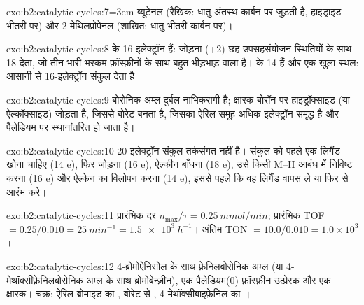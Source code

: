 \begin{solution}{exo:b2:catalytic-cycles:7}\emergencystretch=3em
ब्यूटेनल  (रैखिक: धातु अंतस्थ कार्बन पर जुड़ती है, हाइड्राइड
भीतरी पर) और 2-मेथिलप्रोपेनल  (शाखित: धातु भीतरी
कार्बन पर)।
\end{solution}

\begin{solution}{exo:b2:catalytic-cycles:8}
 के 16 इलेक्ट्रॉन हैं:  जोड़ना (+2) छह
उपसहसंयोजन स्थितियों के साथ 18 देता, जो तीन भारी-भरकम फ़ॉस्फ़ीनों के साथ बहुत भीड़भाड़ वाला है।  के 14
हैं और एक खुला स्थल:  आसानी से 16-इलेक्ट्रॉन संकुल देता है।
\end{solution}

\begin{solution}{exo:b2:catalytic-cycles:9}
बोरोनिक अम्ल दुर्बल नाभिकरागी है; क्षारक बोरॉन पर हाइड्रॉक्साइड (या ऐल्कॉक्साइड) जोड़ता है,
जिससे बोरेट  बनता है, जिसका ऐरिल समूह अधिक इलेक्ट्रॉन-समृद्ध है और
पैलेडियम पर स्थानांतरित हो जाता है।
\end{solution}

\begin{solution}{exo:b2:catalytic-cycles:10}
20-इलेक्ट्रॉन संकुल तर्कसंगत नहीं है। संकुल को पहले एक लिगैंड खोना चाहिए (14 e), फिर
 जोड़ना (16 e), ऐल्कीन बाँधना (18 e), उसे किसी M--H आबंध में निविष्ट करना (16 e) और
ऐल्केन का विलोपन करना (14 e), इससे पहले कि वह लिगैंड वापस ले या फिर से आरंभ करे।
\end{solution}

\begin{solution}{exo:b2:catalytic-cycles:11}
प्रारंभिक दर $n_{\max}/\tau = \qty{0.25}{mmol/min}$; प्रारंभिक TOF $= 0.25/0.010 =
\qty{25}{min^{-1}} = \qty{1.5e3}{h^{-1}}$। अंतिम TON $= 10.0/0.010 = 1.0 \times 10^3$।
\end{solution}

\begin{solution}{exo:b2:catalytic-cycles:12}
4-ब्रोमोऐनिसोल के साथ फ़ेनिलबोरोनिक अम्ल (या 4-मेथॉक्सीफ़ेनिलबोरोनिक अम्ल के साथ ब्रोमोबेन्ज़ीन),
एक पैलेडियम(0) फ़ॉस्फ़ीन उत्प्रेरक और एक क्षारक। चक्र: ऐरिल ब्रोमाइड का
, बोरेट से , 4-मेथॉक्सीबाइफ़ेनिल का
।
\end{solution}

